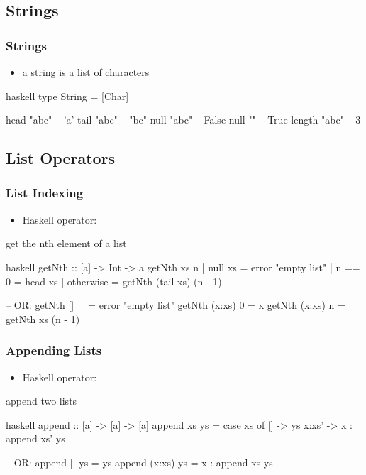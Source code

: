 \documentclass[dvipsnames]{beamer}
\theoremstyle{plain}
\begin{document}
\subsection{Strings}

\begin{frame}[fragile]
  \frametitle{Strings}

  \begin{itemize}
    \item a string is a list of characters
  \end{itemize}

  \begin{exampleblock}{}
    \begin{pygments}{haskell}
type String = [Char]

head "abc"    -- 'a'
tail "abc"    -- "bc"
null "abc"    -- False
null ""       -- True
length "abc"  -- 3
    \end{pygments}
  \end{exampleblock}
\end{frame}

\subsection{List Operators}

\begin{frame}[fragile]
  \frametitle{List Indexing}

  \begin{itemize}
    \item Haskell operator: 
  \end{itemize}

  \begin{exampleblock}{get the nth element of a list}
    \begin{pygments}{haskell}
getNth :: [a] -> Int -> a
getNth xs n
  | null xs   = error "empty list"
  | n == 0    = head xs
  | otherwise = getNth (tail xs) (n - 1)

-- OR:
getNth []     _ = error "empty list"
getNth (x:xs) 0 = x
getNth (x:xs) n = getNth xs (n - 1)
    \end{pygments}
  \end{exampleblock}
\end{frame}

\begin{frame}[fragile]
  \frametitle{Appending Lists}

  \begin{itemize}
    \item Haskell operator: 
  \end{itemize}

  \begin{exampleblock}{append two lists}
    \begin{pygments}{haskell}
append :: [a] -> [a] -> [a]
append xs ys =
    case xs of
      []    -> ys
      x:xs' -> x : append xs' ys

-- OR:
append []     ys = ys
append (x:xs) ys = x : append xs ys
    \end{pygments}
  \end{exampleblock}
\end{frame}
\end{document}
